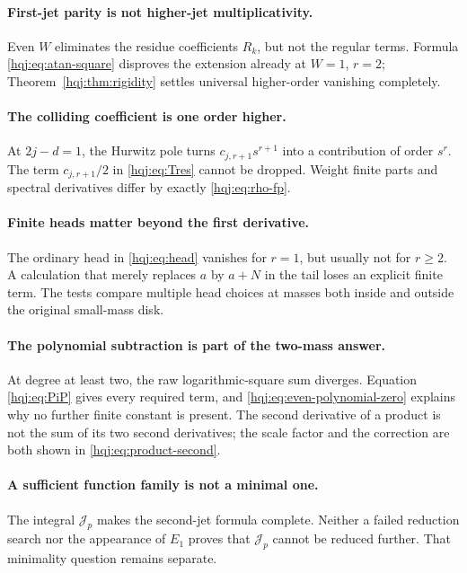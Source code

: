 \paragraph{First-jet parity is not higher-jet multiplicativity.}
Even $W$ eliminates the residue coefficients $R_k$, but not the
regular terms. Formula \eqref{hqj:eq:atan-square} disproves the
extension already at $W=1$, $r=2$; Theorem~\ref{hqj:thm:rigidity}
settles universal higher-order vanishing completely.

\paragraph{The colliding coefficient is one order higher.}
At $2j-d=1$, the Hurwitz pole turns $c_{j,r+1}s^{r+1}$ into a
contribution of order $s^r$. The term $c_{j,r+1}/2$ in
\eqref{hqj:eq:Tres} cannot be dropped. Weight finite parts and spectral
derivatives differ by exactly \eqref{hqj:eq:rho-fp}.

\paragraph{Finite heads matter beyond the first derivative.}
The ordinary head in \eqref{hqj:eq:head} vanishes for $r=1$, but
usually not for $r\ge2$. A calculation that merely replaces $a$ by
$a+N$ in the tail loses an explicit finite term. The tests compare
multiple head choices at masses both inside and outside the original
small-mass disk.

\paragraph{The polynomial subtraction is part of the two-mass answer.}
At degree at least two, the raw logarithmic-square sum diverges.
Equation \eqref{hqj:eq:PiP} gives every required term, and
\eqref{hqj:eq:even-polynomial-zero} explains why no further finite
constant is present. The second derivative of a product is not the
sum of its two second derivatives; the scale factor and the correction
are both shown in \eqref{hqj:eq:product-second}.

\paragraph{A sufficient function family is not a minimal one.}
The integral $\mathcal J_p$ makes the second-jet formula complete.
Neither a failed reduction search nor the appearance of $E_1$ proves
that $\mathcal J_p$ cannot be reduced further. That minimality question
remains separate.

